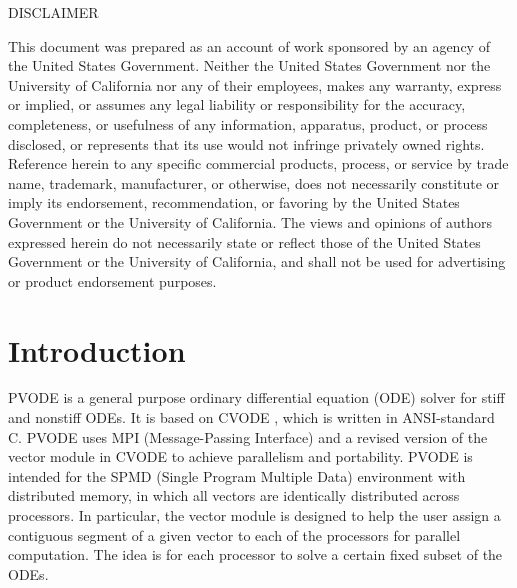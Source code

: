 \newpage


\thispagestyle{empty}

%
%
\vspace*{1.0in}
\scriptsize
\begin{center}
\begin{minipage}{4.0in}
\begin{center}
DISCLAIMER
\end{center}
This document was prepared as an account of work sponsored by an
agency of the United States Government.
Neither the United States Government nor the University of California
nor any of their employees, makes any warranty, express or implied, or
assumes any legal liability or responsibility for the accuracy,
completeness, or usefulness of any information, apparatus, product, or
process disclosed, or represents that its use would not infringe
privately owned rights.
Reference herein to any specific commercial products, process, or
service by trade name, trademark, manufacturer, or otherwise, does not
necessarily constitute or imply its endorsement, recommendation, or
favoring by the United States Government or the University of
California.
The views and opinions of authors expressed herein do not necessarily
state or reflect those of the United States Government or the
University of California, and shall not be used for advertising or
product endorsement purposes.  
\end{minipage}
\end{center}

\normalsize




\maketitle


\setcounter{page}{1}


\section{Introduction}

PVODE is a general purpose ordinary differential equation (ODE) solver
for stiff and nonstiff ODEs.  It is based on CVODE \cite{CVODE_UG}
\cite{CVODE}, which is written in ANSI-standard C. PVODE uses MPI
(Message-Passing Interface) \cite{MPI} and a revised version of the
vector module in CVODE to achieve parallelism and portability. PVODE
is intended for the SPMD (Single Program Multiple Data) environment
with distributed memory, in which all vectors are identically
distributed across processors. In particular, the vector module is
designed to help the user assign a contiguous segment of a given
vector to each of the processors for parallel computation. The idea is
for each processor to solve a certain fixed subset of the ODEs.

